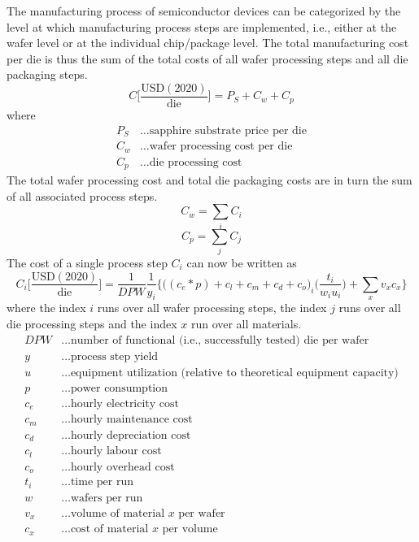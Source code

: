 \documentclass[parskip=full]{article}
\begin{document}
The manufacturing process of semiconductor devices can be categorized by the level at which manufacturing process steps are implemented, i.e., either at the wafer level or at the individual chip/package level. The total manufacturing cost per die is thus the sum of the total costs of all wafer processing steps and all die packaging steps.
%
\begin{equation}
\label{eqn:cost_sum}
    C \bigg[ \frac{ \text{USD}(2020) }{ \text{die} } \bigg] = P_S + C_w + C_p
\end{equation}
%
where
%
\begin{align*}
    P_S &\dots \text{sapphire substrate price per die} \\
    C_w &\dots \text{wafer processing cost per die} \\
    C_p &\dots \text{die processing cost}
\end{align*}
%
The total wafer processing cost and total die packaging costs are in turn the sum of all associated process steps.
%
\begin{equation}
        C_w = \sum_i C_i
\end{equation}
%
\begin{equation}
	C_p = \sum_j C_j
\end{equation}
%
The cost of a single process step $C_i$ can now be written as
%
\begin{equation}
\label{eqn:cost_wafer}
    C_i \bigg[ \frac{ \text{USD}(2020) }{ \text{die} } \bigg] =\frac{1}{DPW}  \frac{1}{y_i}   \bigg\{ \bigg((c_e*p) + c_l + c_m + c_d + c_o \bigg)_i \bigg( \frac{t_i}{w_i u_i} \bigg) + \sum_{x} v_x c_x \bigg\}
\end{equation}
%
where the index $i$ runs over all wafer processing steps, the index $j$ runs over all die processing steps and the index $x$ run over all materials.
%
\begin{align*}
        DPW &\dots \text{number of functional (i.e., successfully tested) die per wafer}\\
        y &\dots \text{process step yield} \\
        u &\dots \text{equipment utilization (relative to theoretical equipment capacity)} \\
        p &\dots \text{power consumption} \\
        c_e &\dots \text{hourly electricity cost} \\
        c_m &\dots \text{hourly maintenance cost} \\
        c_d &\dots \text{hourly depreciation cost}\\
        c_l &\dots \text{hourly labour cost} \\
        c_o &\dots \text{hourly overhead cost} \\
        t_i &\dots \text{time per run} \\
        w &\dots \text{wafers per run} \\
        v_x &\dots \text{volume of material $x$ per wafer} \\
        c_x &\dots \text{cost of material $x$ per volume}\\
\end{align*}
\end{document}

